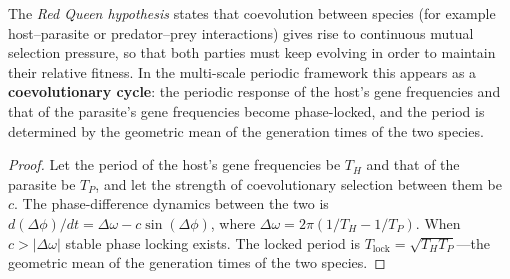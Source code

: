 \begin{corollary}\label{cor:red_queen}
The \emph{Red Queen hypothesis} states that coevolution between species (for example host--parasite or predator--prey interactions) gives rise to continuous mutual selection pressure, so that both parties must keep evolving in order to maintain their relative fitness. In the multi-scale periodic framework this appears as a \textbf{coevolutionary cycle}: the periodic response of the host's gene frequencies and that of the parasite's gene frequencies become phase-locked, and the period is determined by the geometric mean of the generation times of the two species.
\end{corollary}

\begin{proof}
Let the period of the host's gene frequencies be $T_H$ and that of the parasite be $T_P$, and let the strength of coevolutionary selection between them be $c$. The phase-difference dynamics between the two is $d(\Delta\phi)/dt = \Delta\omega - c \sin(\Delta\phi)$, where $\Delta\omega = 2\pi(1/T_H - 1/T_P)$. When $c > |\Delta\omega|$ stable phase locking exists. The locked period is $T_{\text{lock}} = \sqrt{T_H T_P}$---the geometric mean of the generation times of the two species.
\end{proof}

